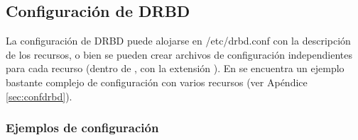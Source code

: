 


% 


\subsection{Configuración de DRBD}

La configuración de DRBD puede alojarse en /etc/drbd.conf con la descripción de los recursos, o bien se pueden crear archivos de configuración independientes para cada recurso (dentro de , con la extensión ). En  se encuentra un ejemplo bastante complejo de configuración con varios recursos (ver Apéndice \ref{sec:confdrbd}). 
\\




\subsubsection{Ejemplos de configuración}

